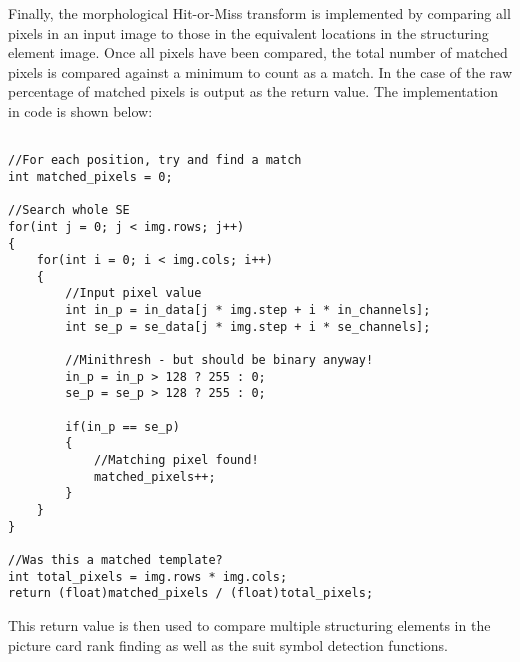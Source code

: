 			Finally, the morphological Hit-or-Miss transform is implemented by comparing all pixels in an input image to those in the equivalent locations in the structuring element image. Once all pixels have been compared, the total number of matched pixels is compared against a minimum to count as a match. In the case of  the raw percentage of matched pixels is output as the return value. The implementation in code is shown below:

			\begin{lstlisting}

//For each position, try and find a match
int matched_pixels = 0;

//Search whole SE
for(int j = 0; j < img.rows; j++)
{
	for(int i = 0; i < img.cols; i++)
	{
		//Input pixel value
		int in_p = in_data[j * img.step + i * in_channels];
		int se_p = se_data[j * img.step + i * se_channels];

		//Minithresh - but should be binary anyway!
		in_p = in_p > 128 ? 255 : 0;
		se_p = se_p > 128 ? 255 : 0;

		if(in_p == se_p)
		{
			//Matching pixel found!
			matched_pixels++;
		}
	}
}

//Was this a matched template?
int total_pixels = img.rows * img.cols;
return (float)matched_pixels / (float)total_pixels;
			\end{lstlisting}

			This return value is then used to compare multiple structuring elements in the picture card rank finding as well as the suit symbol detection functions.
